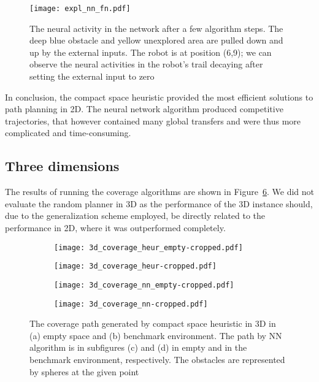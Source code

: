 \documentclass[buriama8_dp.tex]{subfiles}
\begin{document}
\begin{figure}[ht]
  \centering
  \texttt{[image: expl\_nn\_fn.pdf]}
  \caption{The neural activity in the network after a few algorithm steps. The deep blue obstacle and yellow unexplored area are pulled down and up by the external inputs. The robot is at position (6,9); we can observe the neural activities in the robot's trail decaying after setting the external input to zero}
  \label{fig:nn_fn}
\end{figure}


In conclusion, the compact space heuristic provided the most efficient solutions to path planning in 2D. The neural network algorithm produced competitive trajectories, that however contained many global transfers and were thus more complicated and time-consuming.

\subsection{Three dimensions}
\label{subsec:3d_sim}

The results of running the coverage algorithms are shown in Figure~\ref{fig:heur_3d_coverage}. We did not evaluate the random planner in 3D as the performance of the 3D instance should, due to the generalization scheme employed, be directly related to the performance in 2D, where it was outperformed completely. 

\begin{figure}[tp]
  \centering
  \begin{subfigure}[t]{0.48\textwidth}
    \texttt{[image: 3d\_coverage\_heur\_empty-cropped.pdf]}
    \caption{}
    \label{fig:heur_3d_empty}
  \end{subfigure}
  \;
  \begin{subfigure}[t]{0.48\textwidth}
    \texttt{[image: 3d\_coverage\_heur-cropped.pdf]}
    \caption{}
    \label{fig:heur_3d_env}
  \end{subfigure}
  
 \begin{subfigure}[t]{0.48\textwidth}
    \texttt{[image: 3d\_coverage\_nn\_empty-cropped.pdf]}
    \caption{}
    \label{fig:nn_3d_empty}
  \end{subfigure}
  \;
  \begin{subfigure}[t]{0.48\textwidth}
    \texttt{[image: 3d\_coverage\_nn-cropped.pdf]}
    \caption{}
    \label{fig:nn_3d_env}
  \end{subfigure}
  
  \caption[Coverage path -- compact space heuristic in 3D]{The coverage path generated  by compact space heuristic in 3D in (a) empty space and (b) benchmark environment. The path by NN algorithm is in subfigures (c) and (d) in empty and in the benchmark environment, respectively. The obstacles are represented by spheres at the given point}
  \label{fig:heur_3d_coverage}
\end{figure}
\end{document}
